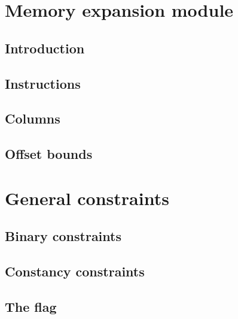 \section{Memory expansion module}

\subsection{Introduction}                                    
\subsection{Instructions}                                    
\subsection{Columns}                                         
\subsection{Offset bounds}                                                                    \label{mxp: offset bounds}
                                                                                                             
\section{General constraints}                                                                                
\subsection{Binary constraints}                                                                \label{mxp: binary}
\subsection{Constancy constraints}                                                        \label{mxp: counter-constancies}
\subsection{The \roob{} flag}                                                                    \label{mxp: roob}
